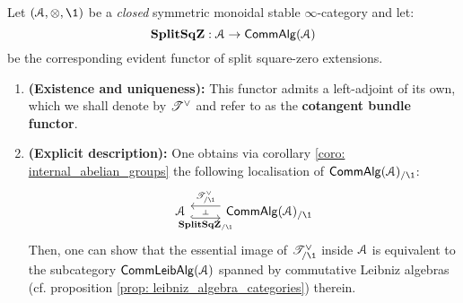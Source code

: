                 \begin{lemma} \label{lemma: cotangent_bundles} 
                    Let $(\calA, \tensor, \1)$ be a \textit{closed} symmetric monoidal stable $\infty$-category and let:
                        $$\mathbf{Split}\mathbf{Sq}\mathbf{Z}: \mathcal{A} \to \mathsf{Comm}\mathsf{Alg}(\mathcal{A})$$
                    be the corresponding evident functor of split square-zero extensions.
                        \begin{enumerate}
                            \item \textbf{(Existence and uniqueness):} This functor admits a left-adjoint of its own, which we shall denote by $\mathscr{T}^{\vee}$ and refer to as the \textbf{cotangent bundle functor}.
                            \item \textbf{(Explicit description):} One obtains via corollary \ref{coro: internal_abelian_groups} the following localisation of $\Comm\Alg(\calA)_{/\1}$:
                                $$
                                    \begin{tikzcd}
                                    	\calA & {\Comm\Alg(\calA)_{/\1}}
                                    	\arrow[""{name=0, anchor=center, inner sep=0}, "\Split\SqZ_{/\1}"', shift right=2, hook, from=1-1, to=1-2]
                                    	\arrow[""{name=1, anchor=center, inner sep=0}, "{\T^{\vee}_{/\1}}"', shift right=2, from=1-2, to=1-1]
                                    	\arrow["\dashv"{anchor=center, rotate=-90}, draw=none, from=1, to=0]
                                    \end{tikzcd}
                                $$
                            Then, one can show that the essential image of $\T^{\vee}_{/\1}$ inside $\mathcal{A}$ is equivalent to the subcategory $\mathsf{Comm}\mathsf{Leib}\mathsf{Alg}(\mathcal{A})$ spanned by commutative Leibniz algebras (cf. proposition \ref{prop: leibniz_algebra_categories}) therein.
                        \end{enumerate}
                \end{lemma}
